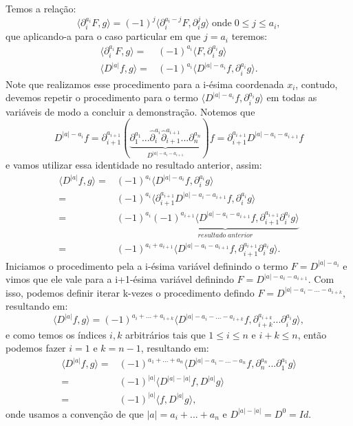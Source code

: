 \documentclass{article}
\begin{document}
\begin{enumerate}
		Temos a relação:
		$$
		\langle \partial^{a_{i}}_{i}F, g \rangle = (-1)^{j}\langle \partial^{a_{i}-j}_{i}F, \partial^{j}_{i}g \rangle \; \text{onde} \; 0 \leq j \leq a_{i},
		$$
		que aplicando-a para o caso particular em que $j = a_{i}$ teremos: 
		$$
		\begin{aligned}
		\langle \partial^{a_{i}}_{i}F, g \rangle = & (-1)^{a_{i}}\langle F, \partial^{a_{i}}_{i}g \rangle
		\\
		\langle D^{|a|}f, g \rangle = & (-1)^{a_{i}}\langle  D^{|a|-a_{i}}f, \partial^{a_{i}}_{i}g \rangle.
		\end{aligned}
		$$
		Note que realizamos esse procedimento para a i-ésima coordenada $x_{i}$, contudo, devemos repetir o procedimento para o termo  $\langle  D^{|a|-a_{i}}f, \partial^{a_{i}}_{i}g \rangle$ em todas as variáveis de modo a concluir a demonstração. Notemos que 
		$$
		D^{|a|-a_{i}}f = \partial^{a_{i+1}}_{i+1}(\underbrace{ \partial^{a_{1}}_{1}...\hat{\partial}^{a_{i}}_{i}\hat{\partial}^{a_{i+1}}_{i+1}...\partial^{a_{n}}_{n} }_{D^{|a|-a_{i}-a_{i+1}} } )f = \partial^{a_{i+1}}_{i+1}	D^{|a|-a_{i}-a_{i+1}}f
		$$
		e vamos utilizar essa identidade no resultado anterior, assim: 
		$$
		\begin{aligned}
		\langle D^{|a|}f, g \rangle = & (-1)^{a_{i}}\langle  D^{|a|-a_{i}}f, \partial^{a_{i}}_{i}g \rangle
		\\
		= & (-1)^{a_{i}}\langle \partial^{a_{i+1}}_{i+1} D^{|a|-a_{i}-a_{i+1}}f, \partial^{a_{i}}_{i}g \rangle
		\\
		= & (-1)^{a_{i}} \underbrace{ (-1)^{a_{i+1}}\langle D^{|a|-a_{i}-a_{i+1}}f, \partial^{a_{i+1}}_{i+1}\partial^{a_{i}}_{i}g \rangle }_{resultado \; anterior}
		\\
		= & (-1)^{a_{i}+a_{i+1}}\langle D^{|a|-a_{i}-a_{i+1}}f, \partial^{a_{i+1}}_{i+1}\partial^{a_{i}}_{i}g \rangle.
		\end{aligned}
		$$
		Iniciamos o procedimento pela a i-ésima variável definindo o termo $F = D^{|a|- a_{i}}$ e vimos que ele vale para a i+1-ésima variável definindo $F = D^{|a|- a_{i} - a_{i+1}}$. Com isso, podemos definir iterar k-vezes o procedimento defindo $F = D^{|a|- a_{i} - ... -a_{i+k}}$, resultando em:
		$$
		\langle D^{|a|}f, g \rangle = (-1)^{a_{i}+...+a_{i+k}}\langle D^{|a|-a_{i}-...-a_{i+k}}f, \partial^{a_{i+k}}_{i+k}...\partial^{a_{i}}_{i}g \rangle,
		$$
		e como temos os índices $i,k$ arbitrários tais que $1\leq i  \leq n$ e $i+k \leq n$, então podemos fazer $i=1$ e $k=n-1$, resultando em:
		$$
		\begin{aligned}
		\langle D^{|a|}f, g \rangle = & (-1)^{a_{1}+...+a_{n}}\langle D^{|a|-a_{i}-...-a_{n}}f, \partial^{a_{n}}_{n}...\partial^{a_{1}}_{1}g \rangle
		\\
		= & (-1)^{|a|}\langle D^{|a|-|a|}f, D^{|a|}g \rangle
		\\
		= & (-1)^{|a|}\langle f, D^{|a|}g \rangle,
		\end{aligned}
		$$
		onde usamos a convenção de que $|a| = a_{i}+...+a_{n}$ e  $D^{|a|-|a|} = D^{0} = Id$.
			

\end{enumerate}
\end{document}
